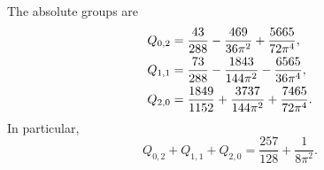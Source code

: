 \begin{prp}\label{prp:s04:second-correction}
The absolute groups are
\begin{align}
 Q_{0,2}&=\frac{43}{288}-\frac{469}{36\pi^2}
                                      +\frac{5665}{72\pi^4},\notag\\
 Q_{1,1}&=\frac{73}{288}-\frac{1843}{144\pi^2}
                                      -\frac{6565}{36\pi^4},\notag\\
 Q_{2,0}&=\frac{1849}{1152}+\frac{3737}{144\pi^2}
                                      +\frac{7465}{72\pi^4}.
 \label{eq:s04:second-groups}
\end{align}
In particular,
\begin{equation}\label{eq:s04:second-total}
 Q_{0,2}+Q_{1,1}+Q_{2,0}=\frac{257}{128}+\frac1{8\pi^2}.
\end{equation}
\end{prp}

